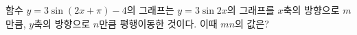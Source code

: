 함수 $y=3\sin(2x+\pi)-4$의 그래프는 $y=3\sin 2x$의 그래프를 $x$축의 방향으로 $m$만큼, $y$축의 방향으로 $n$만큼 평행이동한 것이다. 이때 $mn$의 값은? 
